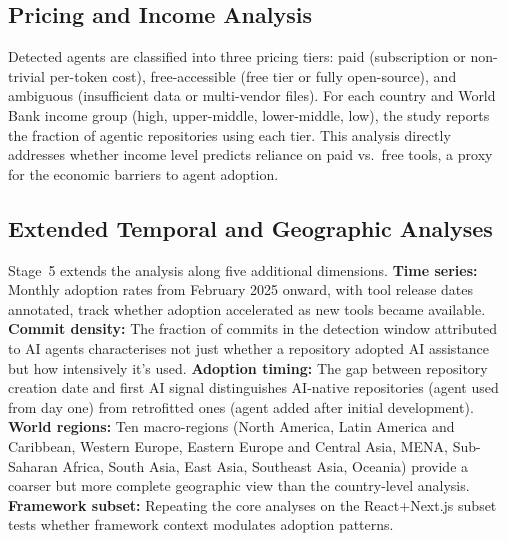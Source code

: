 \subsection{Pricing and Income Analysis}

Detected agents are classified into three pricing tiers: paid (subscription or non-trivial per-token cost), free-accessible (free tier or fully open-source), and ambiguous (insufficient data or multi-vendor files). For each country and World Bank income group (high, upper-middle, lower-middle, low), the study reports the fraction of agentic repositories using each tier. This analysis directly addresses whether income level predicts reliance on paid vs.\ free tools, a proxy for the economic barriers to agent adoption.

\subsection{Extended Temporal and Geographic Analyses}

Stage~5 extends the analysis along five additional dimensions. \textbf{Time series:} Monthly adoption rates from February 2025 onward, with tool release dates annotated, track whether adoption accelerated as new tools became available. \textbf{Commit density:} The fraction of commits in the detection window attributed to AI agents characterises not just whether a repository adopted AI assistance but how intensively it's used. \textbf{Adoption timing:} The gap between repository creation date and first AI signal distinguishes AI-native repositories (agent used from day one) from retrofitted ones (agent added after initial development). \textbf{World regions:} Ten macro-regions (North America, Latin America and Caribbean, Western Europe, Eastern Europe and Central Asia, MENA, Sub-Saharan Africa, South Asia, East Asia, Southeast Asia, Oceania) provide a coarser but more complete geographic view than the country-level analysis. \textbf{Framework subset:} Repeating the core analyses on the React+Next.js subset tests whether framework context modulates adoption patterns.
